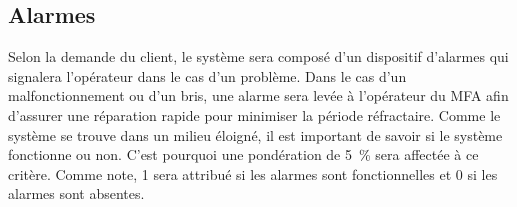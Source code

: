 

\subsection{Alarmes}
\label{s:cdc_sec_alar}

Selon la demande du client, le système sera composé d’un dispositif d’alarmes qui signalera l’opérateur dans le cas d’un problème.
Dans le cas d’un malfonctionnement ou d’un bris, une alarme sera levée à l’opérateur du MFA afin d’assurer une réparation rapide pour minimiser la période réfractaire.
Comme le système se trouve dans un milieu éloigné, il est important de savoir si le système fonctionne ou non.
C’est pourquoi une pondération de 5~\% sera affectée à ce critère.
Comme note, 1 sera attribué si les alarmes sont fonctionnelles et 0 si les alarmes sont absentes.
